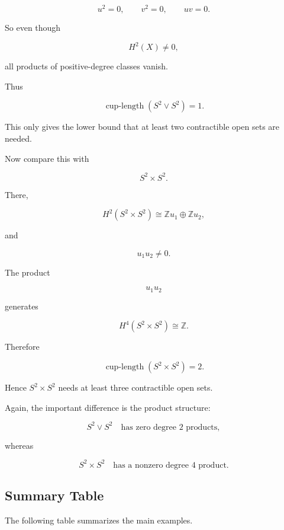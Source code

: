 \documentclass[12pt,a4paper]{article}
\theoremstyle{notespace}
\begin{document}
\[
u^2=0,
\qquad
v^2=0,
\qquad
uv=0.
\]

So even though

\[
H^2(X)\neq 0,
\]

all products of positive-degree classes vanish.

Thus

\[
\operatorname{cup\text{-}length}(S^2\vee S^2)=1.
\]

This only gives the lower bound that at least two contractible open sets are needed.

Now compare this with

\[
S^2\times S^2.
\]

There,

\[
H^2(S^2\times S^2)
\cong
\mathbb Z u_1\oplus \mathbb Z u_2,
\]

and

\[
u_1u_2\neq 0.
\]

The product

\[
u_1u_2
\]

generates

\[
H^4(S^2\times S^2)\cong \mathbb Z.
\]

Therefore

\[
\operatorname{cup\text{-}length}(S^2\times S^2)=2.
\]

Hence \(S^2\times S^2\) needs at least three contractible open sets.

Again, the important difference is the product structure:

\[
S^2\vee S^2
\quad\text{has zero degree }2\text{ products},
\]

whereas

\[
S^2\times S^2
\quad\text{has a nonzero degree }4\text{ product}.
\]

\subsection{Summary Table}

The following table summarizes the main examples.
\end{document}
